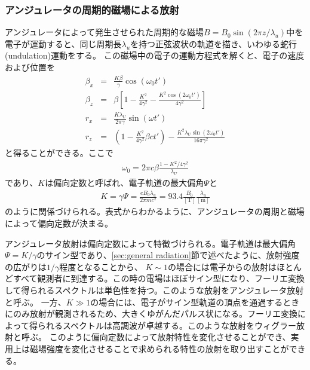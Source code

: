 \documentclass[a4paper,11pt,uplatex]{jsbook}
\begin{document}
\subsubsection{アンジュレータの周期的磁場による放射}\label{sec:undulator radiation}
アンジュレータによって発生させられた周期的な磁場$B = B_0 \sin(2\pi z/\lambda_u)$中を電子が運動すると、同じ周期長$\lambda_u$を持つ正弦波状の軌道を描き、いわゆる蛇行(undulation)運動をする。
この磁場中の電子の運動方程式を解くと、電子の速度および位置を
\begin{eqnarray}\label{eq:undulator motion}
  \beta_x &=& \frac{K\beta}{\gamma}\cos(\omega_0 t')\\
  \beta_z &=& \beta\left[1 - \frac{K^2}{4\gamma^2} -\frac{K^2\cos (2\omega_0 t')}{4\gamma^2} \right]\\
  r_x &=& \frac{K\lambda_U}{2\pi \gamma}\sin(\omega t')\\
  r_z &=& \left(1-\frac{K^2}{4\gamma^2}\beta c t'\right) - \frac{K^2\lambda_U \sin(2\omega_0 t')}{16\pi \gamma^2}
\end{eqnarray}
と得ることができる。ここで
\begin{eqnarray}
  \omega_0 = 2\pi c\beta \frac{1-K^2/4\gamma^2}{\lambda_U}
\end{eqnarray}
であり、$K$は偏向定数と呼ばれ、電子軌道の最大偏角$\Psi$と
\begin{eqnarray}
  K = \gamma \Psi = \frac{eB_0\lambda_u}{2\pi m c^2} = 93.4 \frac{B_0}{[\text{T}]}\frac{\lambda_u}{[\text{m}]}
\end{eqnarray}\label{eq:K}
のように関係づけられる。表式からわかるように、アンジュレータの周期と磁場によって偏向定数が決まる。

アンジュレータ放射は偏向定数によって特徴づけられる。電子軌道は最大偏角$\Psi = K/\gamma$のサイン型であり、\ref{sec:general radiation}節で述べたように、放射強度の広がりは$1/\gamma$程度となることから、
$K \sim 1$の場合には電子からの放射はほとんどすべて観測者に到達する。この時の電場はほぼサイン型になり、フーリエ変換して得られるスペクトルは単色性を持つ。このような放射をアンジュレータ放射と呼ぶ。
一方、$K \gg 1$の場合には、電子がサイン型軌道の頂点を通過するときにのみ放射が観測されるため、大きくゆがんだパルス状になる。フーリエ変換によって得られるスペクトルは高調波が卓越する。このような放射をウィグラー放射と呼ぶ。
このように偏向定数によって放射特性を変化させることができ、実用上は磁場強度を変化させることで求められる特性の放射を取り出すことができる。
\end{document}
